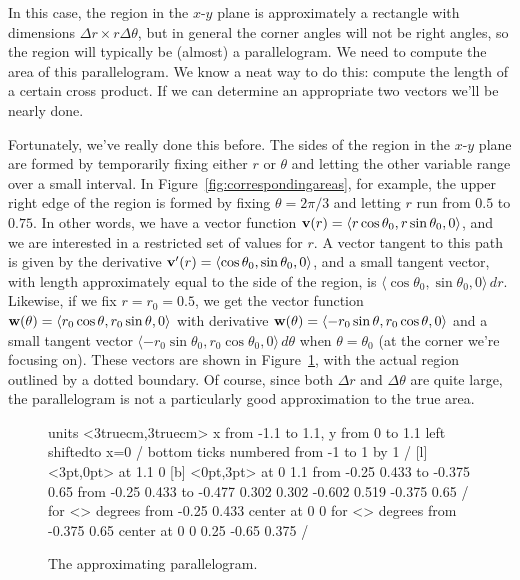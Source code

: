 In this case, the region in the $x$-$y$ plane is approximately a
rectangle with dimensions $\Delta r\times r\Delta\theta$, but in
general the corner angles will not be right angles, so the region will
typically be (almost) a parallelogram. We need to compute the area of
this parallelogram. We know
a neat way to do this: compute the length of a certain cross product.
If we can determine an appropriate two vectors we'll be nearly done.

Fortunately, we've really done this before. The sides of the region in
the $x$-$y$ plane are formed by temporarily fixing either $r$ or
$\theta$ and letting the other variable range over a small interval.
In Figure~\ref{fig:correspondingareas}, for example, the upper right
edge of the region is formed by fixing $\theta=2\pi/3$ and letting $r$
run from $0.5$ to $0.75$. In other words, we have a vector function
${\bf v}(r)=\langle r\cos\theta_0, r\sin\theta_0, 0\rangle$, and we
are interested in a restricted set of values for $r$. A vector tangent
to this path is given by the derivative ${\bf v}'(r)=\langle
\cos\theta_0, \sin\theta_0, 0\rangle$, and a small tangent vector,
with length approximately equal to the side of the region, is $\langle
\cos\theta_0, \sin\theta_0, 0\rangle\,dr$. Likewise, if we fix
$r=r_0=0.5$, we get the vector function ${\bf w}(\theta)=\langle
r_0\cos\theta, r_0\sin\theta, 0\rangle$ with derivative ${\bf
  w}(\theta)=\langle -r_0\sin\theta, r_0\cos\theta, 0\rangle$ and a
small tangent vector $\langle -r_0\sin\theta_0, r_0\cos\theta_0,
0\rangle\,d\theta$ when $\theta=\theta_0$ (at the corner we're
focusing on). These vectors are shown in 
Figure~\ref{fig:smallapproximatingparallelogram}, with the actual
region outlined by a dotted boundary. Of course, since both $\Delta r$
and $\Delta\theta$ are quite large, the parallelogram is not a
particularly good approximation to the true area.

\begin{figure}[H]
\centerline{
\vbox{\beginpicture
\normalgraphs
\setcoordinatesystem units <3truecm,3truecm> 
\setplotarea x from -1.1 to 1.1, y from 0 to 1.1
\axis left shiftedto x=0 /
\axis bottom  ticks numbered from -1 to 1 by 1 /
 [l] <3pt,0pt> at 1.1 0
 [b] <0pt,3pt> at 0 1.1
\arrow <5pt> [0.17, 0.5] from  -0.25 0.433  to  -0.375 0.65
\arrow <5pt> [0.17, 0.5] from -0.25 0.433 to -0.477  0.302
\setdashes
{}  0.302 -0.602 0.519 -0.375 0.65 /
\setdotsnear <2pt> for <\totalarclength>
 degrees from -0.25 0.433 center at 0 0
\setdotsnear <2pt> for <\totalarclength>
 degrees from -0.375 0.65 center at 0 0
\setlinear
{} 0.25 -0.65 0.375 /
\endpicture}}
\caption{The approximating parallelogram.}
\label{fig:smallapproximatingparallelogram}
\end{figure}

